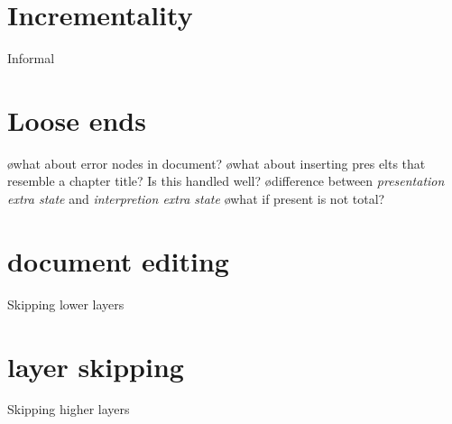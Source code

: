%																
%																
%																
\section{Incrementality}
Informal


%																
%																
%																
\section{Loose ends}
\bl
\o what about error nodes in document?
\o what about inserting pres elts that resemble a chapter title? Is this handled well?
\o difference between {\em presentation extra state} and {\em interpretion extra state}
\o what if present is not total?
\el


%																
%																
%																
\section{document editing}
Skipping lower layers



%																
%																
%																
\section{layer skipping}
Skipping higher layers

\renewcommand{\present}[0]{{\tt present}}					%
\renewcommand{\interpret}[0]{{\tt interpret}}				%
\renewcommand{\Core}[0]{\ensuremath{\mathit{Core}}}	%
                                 